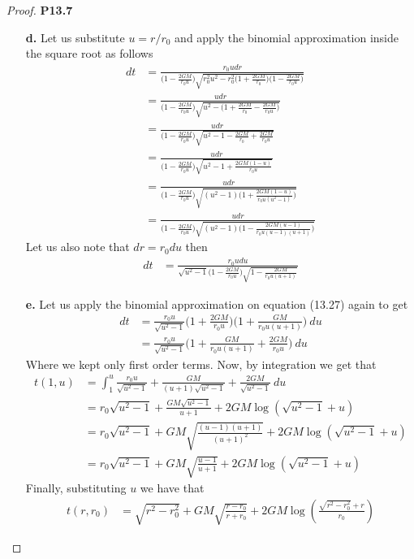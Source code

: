 \documentclass[11pt]{article}
\theoremstyle{definition}
\begin{document}
\begin{proof}{\textbf{P13.7}}
\begin{itemize}
\cleardoublepage
\item [\textbf{d.}] Let us substitute $u = r/r_0$ and apply the binomial
approximation inside the square root as follows
\begin{align*}
    dt &= \frac{r_0udr}{\bigg(1 - \frac{2GM}{r_0 u}\bigg)\sqrt{
    r_0^2u^2 - r_0^2\bigg(1 + \frac{2GM}{r_0}\bigg)\bigg(1 - \frac{2GM}{r_0u}\bigg)}}\\
    &= \frac{udr}{\bigg(1 - \frac{2GM}{r_0 u}\bigg)\sqrt{
    u^2 - \bigg(1 + \frac{2GM}{r_0} - \frac{2GM}{r_0u}\bigg)}}\\
    &= \frac{udr}{\bigg(1 - \frac{2GM}{r_0 u}\bigg)\sqrt{
    u^2 - 1 - \frac{2GM}{r_0} + \frac{2GM}{r_0u}}}\\
    &= \frac{udr}{\bigg(1 - \frac{2GM}{r_0 u}\bigg)\sqrt{
    u^2 - 1 + \frac{2GM(1 - u)}{r_0u}}}\\
    &= \frac{udr}{\bigg(1 - \frac{2GM}{r_0 u}\bigg)\sqrt{
    (u^2 - 1)\bigg(1 + \frac{2GM(1 - u)}{r_0u(u^2 - 1)}\bigg)}}\\
    &= \frac{udr}{\bigg(1 - \frac{2GM}{r_0 u}\bigg)\sqrt{
    (u^2 - 1)\bigg(1 - \frac{2GM(u - 1)}{r_0u(u - 1)(u + 1)}\bigg)}}
\end{align*}
Let us also note that $dr = r_0du$ then
\begin{align*}
    dt &= \frac{r_0 udu}{\sqrt{u^2 - 1}\bigg(1 - \frac{2GM}{r_0 u}\bigg)\sqrt{
    1 - \frac{2GM}{r_0u(u + 1)}}}
\end{align*}

\cleardoublepage
\item [\textbf{e.}] Let us apply the binomial approximation on equation (13.27)
again to get
\begin{align*}
    dt &= \frac{r_0u}{\sqrt{u^2 - 1}}
    \bigg(1 + \frac{2GM}{r_0 u}\bigg)\bigg(1 + \frac{GM}{r_0 u(u + 1)}\bigg)~du\\
    &= \frac{r_0u}{\sqrt{u^2 - 1}}
    \bigg(1 + \frac{GM}{r_0 u(u + 1)} + \frac{2GM}{r_0 u}\bigg)~du
\end{align*}
Where we kept only first order terms. Now, by integration we get that
\begin{align*}
    t(1,u) &= \int_1^u 
    \frac{r_0u}{\sqrt{u^2 - 1}}
    + \frac{GM}{(u + 1)\sqrt{u^2 - 1}} + \frac{2GM}{\sqrt{u^2 - 1}}~du\\
    &= r_0\sqrt{u^2 - 1} + \frac{GM\sqrt{u^2 - 1}}{u + 1} 
    + 2GM\log(\sqrt{u^2 - 1} + u)\\
    &= r_0\sqrt{u^2 - 1} + GM\sqrt{\frac{(u - 1)(u + 1)}{(u + 1)^2}}
    + 2GM\log(\sqrt{u^2 - 1} + u)\\
    &= r_0\sqrt{u^2 - 1} + GM\sqrt{\frac{u - 1}{u + 1}}
    + 2GM\log(\sqrt{u^2 - 1} + u)
\end{align*}
Finally, substituting $u$ we have that
\begin{align*}
    t(r, r_0) &= \sqrt{r^2 - r_0^2} + GM\sqrt{\frac{r - r_0}{r + r_0}}
    + 2GM\log(\frac{\sqrt{r^2 - r_0^2} + r}{r_0})
\end{align*}


\end{itemize}
\end{proof}
\end{document}
